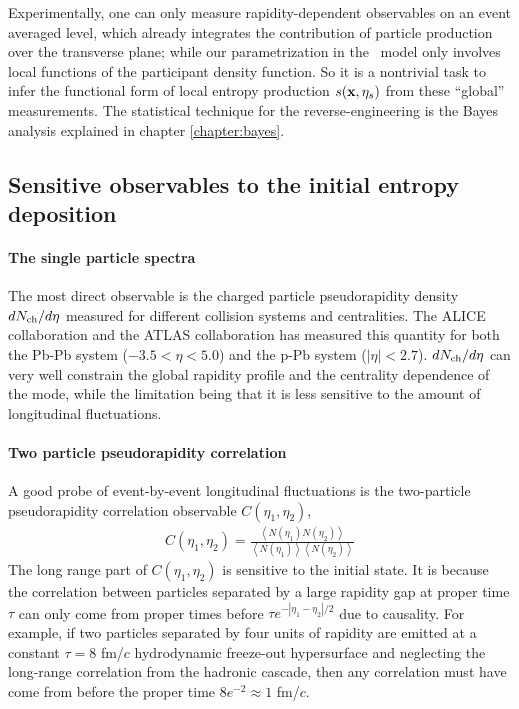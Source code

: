 Experimentally, one can only measure rapidity-dependent observables on an event averaged level, which already integrates the contribution of particle production over the transverse plane; while our parametrization in the \trento\ model only involves local functions of the participant density function.
So it is a nontrivial task to infer the functional form of local entropy production $s(\mathbf x, \eta_s)$ from these ``global'' measurements.
The statistical technique for the reverse-engineering is the Bayes analysis explained in chapter \ref{chapter:bayes}.

\subsection{Sensitive observables to the initial entropy deposition}
\paragraph{The single particle spectra}
The most direct observable is the charged particle pseudorapidity density $dN_\text{ch}/d\eta$ measured for different collision systems and centralities.
The ALICE collaboration and the ATLAS collaboration has measured this quantity for both the Pb-Pb system ($-3.5<\eta<5.0$) and the p-Pb system ($|\eta| < 2.7$).
$dN_\text{ch}/d\eta$ can very well constrain the global rapidity profile and the centrality dependence of the mode, while the limitation being that it is less sensitive to the amount of longitudinal fluctuations.

\paragraph{Two particle pseudorapidity correlation}
A good probe of event-by-event longitudinal fluctuations is the two-particle pseudorapidity correlation observable $C(\eta_1, \eta_2)$,
\begin{eqnarray}
C(\eta_1, \eta_2) = \frac{ \left\langle N(\eta_1)N(\eta_2) \right\rangle}{\left\langle N(\eta_1)\right\rangle\left\langle N(\eta_2) \right\rangle}
\end{eqnarray}
The long range part of $C(\eta_1, \eta_2)$ is sensitive to the initial state.
It is because the correlation between particles separated by a large rapidity gap at proper time $\tau$ can only come from proper times before $\tau e^{-|\eta_1-\eta_2|/2}$ due to causality.
For example, if two particles separated by four units of rapidity are emitted at a constant $\tau = 8$ fm/$c$ hydrodynamic freeze-out hypersurface and neglecting the long-range correlation from the hadronic cascade, then any correlation must have come from before the proper time $ 8 e^{-2}\approx 1$ fm/$c$.

